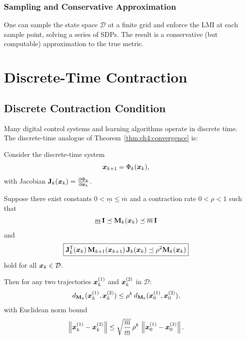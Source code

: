 \subsubsection{Sampling and Conservative Approximation}

One can sample the state space $\mathcal{D}$ at a finite grid and enforce the LMI at each
sample point, solving a series of SDPs. The result is a conservative (but computable)
approximation to the true metric.


\section{Discrete-Time Contraction}

\subsection{Discrete Contraction Condition}

Many digital control systems and learning algorithms operate in discrete time. The
discrete-time analogue of Theorem~\ref{thm:ch4:convergence} is:

\begin{theorem}
\label{thm:ch4:discrete-contraction}
Consider the discrete-time system
\begin{equation}
\bm{x}_{k+1} = \Phi_k(\bm{x}_k),
\label{eq:ch4:discrete-system}
\end{equation}
with Jacobian $\mathbf{J}_k(\bm{x}_k) = \frac{\partial\Phi_k}{\partial\bm{x}_k}$.

Suppose there exist constants $0 < \underline{m} \leq \overline{m}$ and a contraction rate
$0 < \rho < 1$ such that
\begin{equation}
\underline{m}\,\mathbf{I} \preceq \mathbf{M}_k(\bm{x}_k) \preceq \overline{m}\,\mathbf{I}
\label{eq:ch4:discrete-metric-bounds}
\end{equation}
and
\begin{equation}
\boxed{
\mathbf{J}_k^{\mathsf{T}}(\bm{x}_k) \, \mathbf{M}_{k+1}(\bm{x}_{k+1}) \, \mathbf{J}_k(\bm{x}_k) \preceq \rho^2 \mathbf{M}_k(\bm{x}_k)
}
\label{eq:ch4:discrete-contraction-condition}
\end{equation}
hold for all $\bm{x}_k \in \mathcal{D}$.

Then for any two trajectories $\bm{x}_k^{(1)}$ and $\bm{x}_k^{(2)}$ in $\mathcal{D}$:
\begin{equation}
d_{\mathbf{M}_k}(\bm{x}_k^{(1)}, \bm{x}_k^{(2)}) \leq \rho^k \, d_{\mathbf{M}_0}(\bm{x}_0^{(1)}, \bm{x}_0^{(2)}),
\label{eq:ch4:discrete-geodesic-decay}
\end{equation}
with Euclidean norm bound
\begin{equation}
\left\lVert \bm{x}_k^{(1)} - \bm{x}_k^{(2)} \right\rVert \leq \sqrt{\frac{\overline{m}}{\underline{m}}} \, \rho^k \,
\left\lVert \bm{x}_0^{(1)} - \bm{x}_0^{(2)} \right\rVert.
\label{eq:ch4:discrete-euclidean-decay}
\end{equation}
\end{theorem}

